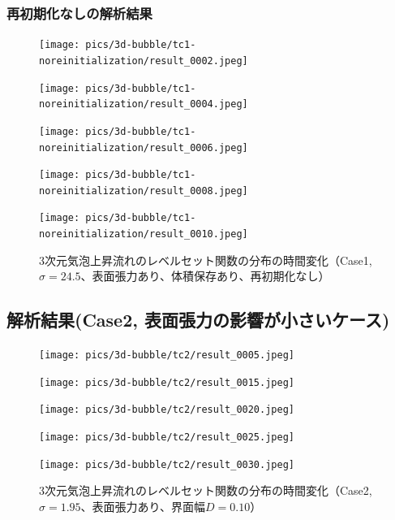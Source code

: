 \subsubsection{再初期化なしの解析結果}
\begin{figure}[H]
	\centering
	\begin{minipage}[b]{0.16\columnwidth}
	    \centering
	    \texttt{[image: pics/3d-bubble/tc1-noreinitialization/result\_0002.jpeg]}
	\end{minipage}
	\begin{minipage}[b]{0.16\columnwidth}
	    \centering
	    \texttt{[image: pics/3d-bubble/tc1-noreinitialization/result\_0004.jpeg]}
	\end{minipage}
	\begin{minipage}[b]{0.16\columnwidth}
	    \centering
	    \texttt{[image: pics/3d-bubble/tc1-noreinitialization/result\_0006.jpeg]}
	\end{minipage}
	\begin{minipage}[b]{0.16\columnwidth}
	    \centering
	    \texttt{[image: pics/3d-bubble/tc1-noreinitialization/result\_0008.jpeg]}
	\end{minipage}
	\begin{minipage}[b]{0.16\columnwidth}
	    \centering
	    \texttt{[image: pics/3d-bubble/tc1-noreinitialization/result\_0010.jpeg]}
	\end{minipage}

	\caption{3次元気泡上昇流れのレベルセット関数の分布の時間変化（Case1, $\sigma=24.5$、表面張力あり、体積保存あり、再初期化なし）}
	\label{fig:3d-bubble_result_tc1}
\end{figure}

\newpage
\subsection{解析結果(Case2, 表面張力の影響が小さいケース)}

\begin{figure}[H]
	\centering
	\begin{minipage}[b]{0.16\columnwidth}
	    \centering
	    \texttt{[image: pics/3d-bubble/tc2/result\_0005.jpeg]}
	\end{minipage}
	\begin{minipage}[b]{0.16\columnwidth}
	    \centering
	    \texttt{[image: pics/3d-bubble/tc2/result\_0015.jpeg]}
	\end{minipage}
	\begin{minipage}[b]{0.16\columnwidth}
	    \centering
	    \texttt{[image: pics/3d-bubble/tc2/result\_0020.jpeg]}
	\end{minipage}
	\begin{minipage}[b]{0.16\columnwidth}
	    \centering
	    \texttt{[image: pics/3d-bubble/tc2/result\_0025.jpeg]}
	\end{minipage}
	\begin{minipage}[b]{0.16\columnwidth}
	    \centering
	    \texttt{[image: pics/3d-bubble/tc2/result\_0030.jpeg]}
	\end{minipage}

	\caption{3次元気泡上昇流れのレベルセット関数の分布の時間変化（Case2, $\sigma=1.95$、表面張力あり、界面幅$D=0.10$）}
	\label{fig:3d-bubble_result_tc2}
\end{figure}

